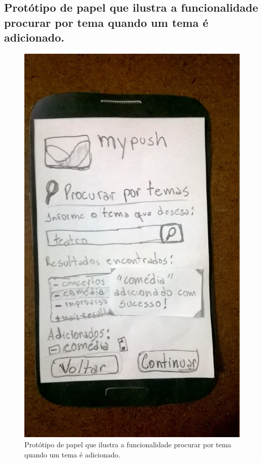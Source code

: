 \begin{anexosenv}
    \pagebreak
    \section*{Protótipo de papel que ilustra a funcionalidade procurar por tema quando um tema é adicionado.}
    
      \begin{figure}[!htbp]
	\centering
	\includegraphics[scale=0.32]{editaveis/figuras/prototipo_papel_v1/tema_adicionado}
	\caption{Protótipo de papel que ilustra a funcionalidade procurar por tema quando um tema é adicionado.}
	\label{tema_adicionado_v1}
      \end{figure}
	

\end{anexosenv}
